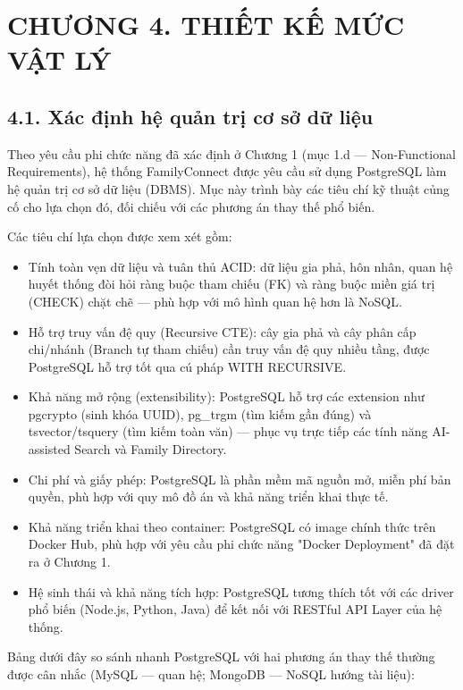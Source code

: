 \section{CHƯƠNG 4. THIẾT KẾ MỨC VẬT LÝ}
\label{sec:chuong4}

\subsection{4.1. Xác định hệ quản trị cơ sở dữ liệu}
\label{sec:he_quan_tri_csdl}

Theo yêu cầu phi chức năng đã xác định ở Chương 1
(mục 1.d --- Non-Functional Requirements), hệ thống
FamilyConnect được yêu cầu sử dụng PostgreSQL làm hệ quản trị
cơ sở dữ liệu (DBMS). Mục này trình bày các tiêu chí kỹ thuật
củng cố cho lựa chọn đó, đối chiếu với các phương án thay thế
phổ biến.

Các tiêu chí lựa chọn được xem xét gồm:

\begin{itemize}
	\item Tính toàn vẹn dữ liệu và tuân thủ ACID:
	dữ liệu gia phả, hôn nhân, quan hệ huyết thống
	đòi hỏi ràng buộc tham chiếu (FK)
	và ràng buộc miền giá trị (CHECK) chặt chẽ
	--- phù hợp với mô hình quan hệ hơn là NoSQL.
	\item Hỗ trợ truy vấn đệ quy (Recursive CTE):
	cây gia phả và cây phân cấp chi/nhánh
	(Branch tự tham chiếu)
	cần truy vấn đệ quy nhiều tầng,
	được PostgreSQL hỗ trợ tốt
	qua cú pháp WITH RECURSIVE.
	\item Khả năng mở rộng (extensibility):
	PostgreSQL hỗ trợ các extension như pgcrypto
	(sinh khóa UUID),
	pg\_trgm (tìm kiếm gần đúng)
	và tsvector/tsquery (tìm kiếm toàn văn)
	--- phục vụ trực tiếp các tính năng
	AI-assisted Search và Family Directory.
	\item Chi phí và giấy phép:
	PostgreSQL là phần mềm mã nguồn mở,
	miễn phí bản quyền,
	phù hợp với quy mô đồ án
	và khả năng triển khai thực tế.
	\item Khả năng triển khai theo container:
	PostgreSQL có image chính thức
	trên Docker Hub,
	phù hợp với yêu cầu phi chức năng
	"Docker Deployment"
	đã đặt ra ở Chương 1.
	\item Hệ sinh thái và khả năng tích hợp:
	PostgreSQL tương thích tốt
	với các driver phổ biến
	(Node.js, Python, Java)
	để kết nối với RESTful API Layer
	của hệ thống.
\end{itemize}

Bảng dưới đây so sánh nhanh PostgreSQL với hai phương án thay thế thường được cân nhắc (MySQL --- quan hệ; MongoDB --- NoSQL hướng tài liệu):

